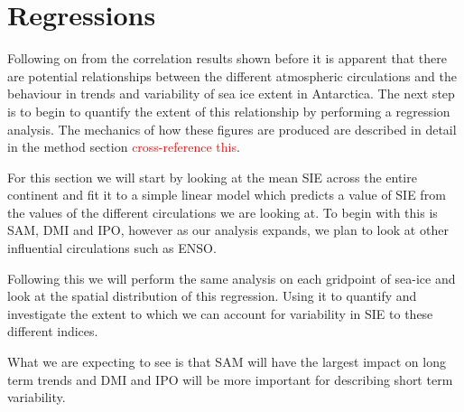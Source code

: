 \chapter{Regressions}

Following on from the correlation results shown before it is apparent that there are potential relationships between the different atmospheric circulations and the behaviour in trends and variability of sea ice extent in Antarctica. The next step is to begin to quantify the extent of this relationship by performing a regression analysis. The mechanics of how these figures are produced are described in detail in the method section \textcolor{red}{cross-reference this}. 

For this section we will start by looking at the mean SIE across the entire continent and fit it to a simple linear model which predicts a value of SIE from the values of the different circulations we are looking at. To begin with this is SAM, DMI and IPO, however as our analysis expands, we plan to look at other influential circulations such as ENSO.

Following this we will perform the same analysis on each gridpoint of sea-ice and look at the spatial distribution of this regression. Using it to quantify and investigate the extent to which we can account for variability in SIE to these different indices.

What we are expecting to see is that SAM will have the largest impact on long term trends and DMI and IPO will be more important for describing short term variability.

\newpage

\newpage

\newpage
